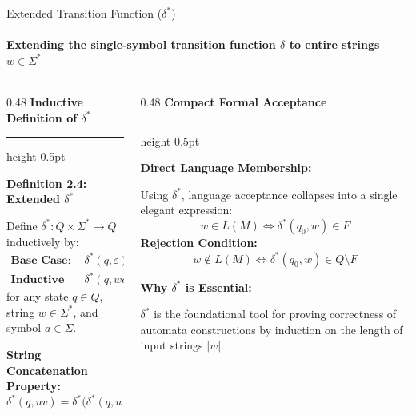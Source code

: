 \documentclass[aspectratio=169, 10pt]{beamer}
\newcommand{\colheader}[1]{%
  {\noindent\footnotesize\bfseries\color{gimpanavy}#1}%
  \vspace{0.02cm}%
  {\color{gimpanavy!30}\hrule height 0.5pt}%
  \vspace{0.05cm}%
}
\newcommand{\cardtitle}[1]{{\noindent\footnotesize\bfseries\color{gimpanavy}#1}\par\vspace{0.03cm}}
\newcommand{\greentitle}[1]{{\noindent\footnotesize\bfseries\color{accentGreen}#1}\par\vspace{0.03cm}}
\begin{document}
\begin{frame}{Extended Transition Function ($\delta^*$)}
  \framesubtitle{Extending the single-symbol transition function $\delta$ to entire strings $w \in \Sigma^*$}
  
  \begin{columns}[T]
    \begin{column}{0.48\textwidth}
      \colheader{Inductive Definition of $\delta^*$}
      \begin{tcolorbox}[conceptcard]
        \cardtitle{Definition 2.4: Extended $\delta^*$}
        {\scriptsize
        Define $\delta^*: Q \times \Sigma^* \to Q$ inductively by:
        \begin{align*}
          \textbf{Base Case:} \quad &\delta^*(q, \varepsilon) = q \\
          \textbf{Inductive Step:} \quad &\delta^*(q, wa) = \delta\bigl(\delta^*(q, w), a\bigr)
        \end{align*}
        for any state $q \in Q$, string $w \in \Sigma^*$, and symbol $a \in \Sigma$.
        \vspace{0.06cm}
        
        \textbf{String Concatenation Property:}
        \[ \delta^*(q, uv) = \delta^*\bigl(\delta^*(q, u), v\bigr) \]
        }
      \end{tcolorbox}
    \end{column}
    
    \begin{column}{0.48\textwidth}
      \colheader{Compact Formal Acceptance}
      \begin{tcolorbox}[examplecard]
        \greentitle{Direct Language Membership:}
        {\scriptsize
        Using $\delta^*$, language acceptance collapses into a single elegant expression:
        \[ w \in L(M) \iff \delta^*(q_0, w) \in F \]
        \textbf{Rejection Condition:}
        \[ w \notin L(M) \iff \delta^*(q_0, w) \in Q \setminus F \]
        }
      \end{tcolorbox}
      \begin{tcolorbox}[spotlightcard]
        \cardtitle{Why $\delta^*$ is Essential:}
        {\scriptsize
        $\delta^*$ is the foundational tool for proving correctness of automata constructions by induction on the length of input strings $|w|$.
        }
      \end{tcolorbox}
    \end{column}
  \end{columns}
\end{frame}
\end{document}
